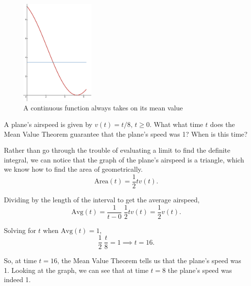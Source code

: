 \begin{figure}[H]
	\label{mvt_integrals}
	\centering
	\includegraphics[width = 0.33\textwidth]{./integrals/mvt.png}
	\caption{A continuous function always takes on its mean value}
\end{figure}

\begin{example}
	A plane's airspeed is given by $v(t) = t/8\text{, }t\geq 0$.
	What what time $t$ does the Mean Value Theorem guarantee that the plane's speed was 1?
	When is this time?
\end{example}
\begin{answer}
	Rather than go through the trouble of evaluating a limit to find the definite integral, we can notice that the graph of the plane's airspeed is a triangle, which we know how to find the area of geometrically.
	\begin{equation*}
		\text{Area}(t) = \frac{1}{2}t v(t).
	\end{equation*}
	
	Dividing by the length of the interval to get the average airspeed,
	\begin{equation*}
		\text{Avg}(t) = \frac{1}{t-0}\hspace{3pt}\frac{1}{2}tv(t) = \frac{1}{2}v(t).
	\end{equation*}
	
	Solving for $t$ when $\text{Avg}(t)=1$,
	\begin{equation*}
		\frac{1}{2}\hspace{3pt}\frac{t}{8} = 1 \implies t = 16.
	\end{equation*}
	
	So, at time $t=16$, the Mean Value Theorem tells us that the plane's speed was 1.
	Looking at the graph, we can see that at time $t=8$ the plane's speed was indeed 1.
\end{answer}

